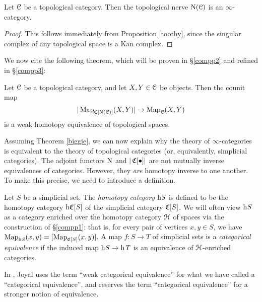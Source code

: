 \begin{corollary}\label{tooky}
Let $\operatorname{\mathcal{C}}$ be a topological category. Then the topological nerve $\operatorname{N}(\operatorname{\mathcal{C}})$ is an $\infty$-category.
\end{corollary}

\begin{proof}
This follows immediately from Proposition \ref{toothy}, since the singular complex of any topological space is a Kan complex.
\end{proof}

We now cite the
following theorem, which will be proven in \S \ref{compp2} and refined in \S \ref{compp3}:

\begin{theorem}\label{biggie}
Let $\operatorname{\mathcal{C}}$ be a topological category, and let $X, Y \in \operatorname{\mathcal{C}}$ be
objects. Then the counit map
$$|\operatorname{{Map}}_{\operatorname{\mathfrak{C}}[\operatorname{N}(\operatorname{\mathcal{C}})]}(X,Y)| \rightarrow \operatorname{{Map}}_{\operatorname{\mathcal{C}}}(X,Y)$$
is a weak homotopy equivalence of topological spaces.
\end{theorem}

Assuming Theorem \ref{biggie}, we can now explain why the theory of $\infty$-categories is 
equivalent to the theory of topological categories (or, equivalently, simplicial categories).
The adjoint functors $\operatorname{N}$ and $| \operatorname{\mathfrak{C}}[ \bullet ] |$ are not mutually inverse equivalences of categories. However, they {\em are} homotopy inverse to one another. To make this precise, we need to introduce a definition.

\begin{definition}\label{tulkas}
Let $S$ be a simplicial set. The {\it homotopy category} $\rm{h} \it{S}$ is defined to be the homotopy category $\rm{h} \it{ \operatorname{\mathfrak{C}}[S]}$ of the simplicial category $\operatorname{\mathfrak{C}}[S]$.
We will often view $\rm{h} \it{S}$ as a category enriched over the homotopy category
$\operatorname{\mathcal{H}}$ of spaces via the construction of \S \ref{compp1}: that is, for
every pair of vertices $x,y \in S$, we have $\operatorname{{Map}}_{ \rm{h} \it{S}}(x,y) = [ \operatorname{{Map}}_{ \operatorname{\mathfrak{C}}[S]}(x,y) ]$.
A map $f: S \rightarrow T$ of simplicial sets is a {\it categorical equivalence} if 
the induced map $\rm{h} \it{S} \rightarrow \rm{h} \it{T}$ is an equivalence of $\operatorname{\mathcal{H}}$-enriched categories.
\end{definition}

\begin{remark}
In \cite{joyalnotpub}, Joyal uses the term ``weak categorical equivalence'' for what we have called a ``categorical equivalence'', and reserves the term ``categorical equivalence'' for a stronger notion of equivalence.
\end{remark}


